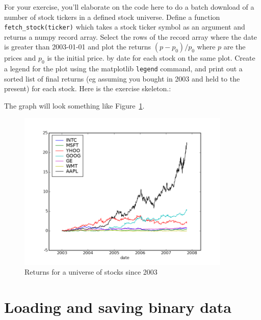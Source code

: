 For your exercise, you'll elaborate on the code here to do a batch
download of a number of stock tickers in a defined stock universe.
Define a function \texttt{fetch\_stock(ticker)} which takes a stock
ticker symbol as an argument and returns a numpy record array.  Select
the rows of the record array where the date is greater than 2003-01-01
and plot the returns $(p-p_0)/p_0$ where $p$ are the prices and $p_0$
is the initial price. by date for each stock on the same plot.  Create
a legend for the plot using the matplotlib \texttt{legend} command,
and print out a sorted list of final returns (eg assuming you bought
in 2003 and held to the present) for each stock.  Here is the exercise
skeleton.:



The graph will look something like Figure~\ref{fig:stock_records}.

\begin{center}%
\begin{figure}
\begin{centering}\includegraphics[width=4in]{fig/stock_records}\par\end{centering}


\caption{\label{fig:stock_records}Returns for a universe of stocks
  since 2003}
\end{figure}
\par\end{center}


\section{Loading and saving binary data}
\label{sec:binary_data}

